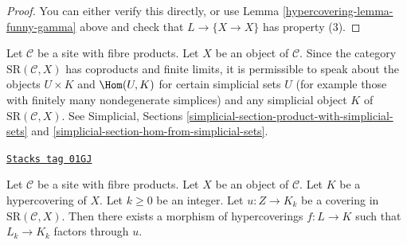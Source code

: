 \begin{proof}

You can either verify this directly, or use
Lemma \ref{hypercovering-lemma-funny-gamma} above and check that $L \to \{X \to X\}$
has property (3).
\end{proof}


Let $\mathcal{C}$ be a site with fibre products.
Let $X$ be an object of $\mathcal{C}$.
Since the category $\text{SR}(\mathcal{C}, X)$ has coproducts and
finite limits, it is permissible to speak about the objects
$U \times K$ and $\Hom(U, K)$ for certain simplicial sets $U$
(for example those with finitely many nondegenerate simplices)
and any simplicial object $K$ of $\text{SR}(\mathcal{C}, X)$.
See Simplicial, Sections
\ref{simplicial-section-product-with-simplicial-sets} and
\ref{simplicial-section-hom-from-simplicial-sets}.

\begin{lemma}[Covering]
\label{hypercovering-lemma-covering}
\href{https://stacks.math.columbia.edu/tag/01GJ}{\texttt{Stacks tag 01GJ}}

Let $\mathcal{C}$ be a site with fibre products.
Let $X$ be an object of $\mathcal{C}$.
Let $K$ be a hypercovering of $X$.
Let $k \geq 0$ be an integer.
Let $u : Z \to K_k$ be a covering
in $\text{SR}(\mathcal{C}, X)$.
Then there exists a morphism of hypercoverings
$f: L \to K$ such that $L_k \to K_k$
factors through $u$.
\end{lemma}

